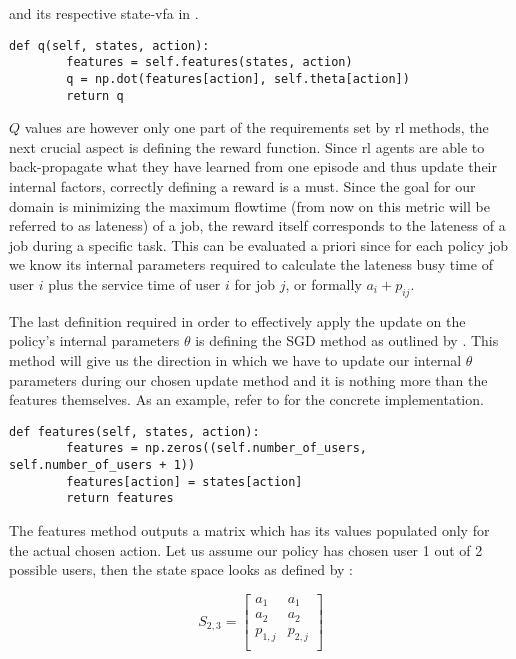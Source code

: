\documentclass{seal_thesis}
\begin{document}
and its respective state-\gls{vfa} in .

\begin{lstlisting}[caption=State-\gls{vfa},label=lst:value_f_approx,style=CustomPython]
    def q(self, states, action):
        features = self.features(states, action)
        q = np.dot(features[action], self.theta[action])
        return q
\end{lstlisting}
 
 $Q$ values are however only one part of the requirements set by \gls{rl} methods, the next crucial aspect is defining the reward function. Since \gls{rl} agents are able to back-propagate what they have learned from one episode and thus update their internal factors, correctly defining a reward is a must. Since the goal for our domain is minimizing the maximum flowtime (from now on this metric will be referred to as lateness) of a job, the reward itself corresponds to the lateness of a job during a specific task. This can be evaluated a priori since for each policy job we know its internal parameters required to calculate the lateness \ie busy time of user $i$ plus the service time of user $i$ for job $j$, or formally $a_i+p_{ij}$.

 The last definition required in order to effectively apply the update on the policy's internal parameters $\theta$ is defining the SGD method as outlined by . This method will give us the direction in which we have to update our internal $\theta$ parameters during our chosen update method and it is nothing more than the features themselves. As an example, refer to  for the concrete implementation.

 \begin{lstlisting}[caption=Features definition,label=lst:features_definition,style=CustomPython]
    def features(self, states, action):
        features = np.zeros((self.number_of_users, self.number_of_users + 1))
        features[action] = states[action]
        return features
\end{lstlisting}

The features method outputs a matrix which has its values populated only for the actual chosen action. Let us assume our policy has chosen user 1 out of 2 possible users, then the state space looks as defined by :

\begin{equation}
\label{eq:kbatch_sp_ex}
	S_{2,3} = 
	\begin{bmatrix}
	a_1 & a_1 \\
	a_2 & a_2 \\
	p_{1,j} & p_{2,j} \\
	\end{bmatrix}
\end{equation}
\end{document}
